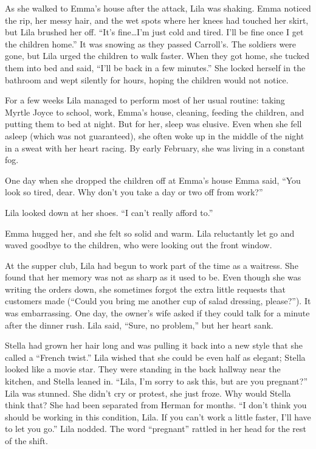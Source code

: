 \documentclass[
  american,
  letterpaper,
]{book}
\begin{document}
As she walked to Emma's house after the attack, Lila was shaking. Emma
noticed the rip, her messy hair, and the wet spots where her knees had
touched her skirt, but Lila brushed her off. ``It's fine\ldots I'm just
cold and tired. I'll be fine once I get the children home.'' It was
snowing as they passed Carroll's. The soldiers were gone, but Lila urged
the children to walk faster. When they got home, she tucked them into
bed and said, ``I'll be back in a few minutes.'' She locked herself in
the bathroom and wept silently for hours, hoping the children would not
notice.

For a few weeks Lila managed to perform most of her usual routine:
taking Myrtle Joyce to school, work, Emma's house, cleaning, feeding the
children, and putting them to bed at night. But for her, sleep was
elusive. Even when she fell asleep (which was not guaranteed), she often
woke up in the middle of the night in a sweat with her heart racing. By
early February, she was living in a constant fog.

One day when she dropped the children off at Emma's house Emma said,
``You look so tired, dear. Why don't you take a day or two off from
work?''

Lila looked down at her shoes. ``I can't really afford to.''

Emma hugged her, and she felt so solid and warm. Lila reluctantly let go
and waved goodbye to the children, who were looking out the front
window.

At the supper club, Lila had begun to work part of the time as a
waitress. She found that her memory was not as sharp as it used to be.
Even though she was writing the orders down, she sometimes forgot the
extra little requests that customers made (``Could you bring me another
cup of salad dressing, please?''). It was embarrassing. One day, the
owner's wife asked if they could talk for a minute after the dinner
rush. Lila said, ``Sure, no problem,'' but her heart sank.

Stella had grown her hair long and was pulling it back into a new style
that she called a ``French twist.'' Lila wished that she could be even
half as elegant; Stella looked like a movie star. They were standing in
the back hallway near the kitchen, and Stella leaned in. ``Lila, I'm
sorry to ask this, but are you pregnant?'' Lila was stunned. She didn't
cry or protest, she just froze. Why would Stella think that? She had
been separated from Herman for months. ``I don't think you should be
working in this condition, Lila. If you can't work a little faster, I'll
have to let you go.'' Lila nodded. The word ``pregnant'' rattled in her
head for the rest of the shift.
\end{document}
